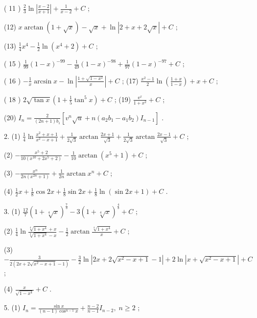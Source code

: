 ( 11 ) \(\frac{2}{3}\ln \left| \frac{x - 2}{x + 1}\right|  + \frac{1}{x - 2} + C\) ;

(12) \(x\arctan \left( {1 + \sqrt{x}}\right)  - \sqrt{x} + \ln \left| {2 + x + 2\sqrt{x}}\right|  + C\) ;

(13) \(\frac{1}{4}{x}^{4} - \frac{1}{2}\ln \left( {{x}^{4} + 2}\right)  + C\) ;

( 15 ) \(\frac{1}{99}{\left( 1 - x\right) }^{-{99}} - \frac{1}{49}{\left( 1 - x\right) }^{-{98}} + \frac{1}{97}{\left( 1 - x\right) }^{-{97}} + C\) ;

( 16 ) \(- \frac{1}{x}\arcsin x - \ln \left| \frac{1 + \sqrt{1 - {x}^{2}}}{x}\right|  + C\) ; (17) \(\frac{{x}^{2} - 1}{2}\ln \left( \frac{1 + x}{1 - x}\right)  + x + C\) ;

( 18 ) \(2\sqrt{\tan x}\left( {1 + \frac{1}{5}{\tan }^{5}x}\right)  + C\) ; (19) \(\frac{{\mathrm{e}}^{x}}{1 + {x}^{2}} + C\) ;

(20) \({I}_{n} = \frac{2}{\left( {{2n} + 1}\right) {b}_{1}}\left\lbrack  {{v}^{n}\sqrt{u} + n\left( {{a}_{2}{b}_{1} - {a}_{1}{b}_{2}}\right) {I}_{n - 1}}\right\rbrack\) .

2. (1) \(\frac{1}{4}\ln \frac{{x}^{2} + x + 1}{{x}^{2} - x + 1} + \frac{1}{2\sqrt{3}}\arctan \frac{{2x} + 1}{\sqrt{3}} + \frac{1}{2\sqrt{3}}\arctan \frac{{2x} - 1}{\sqrt{3}} + C\) ;

(2) \(- \frac{{x}^{5} + 2}{{10}\left( {{x}^{10} + 2{x}^{5} + 2}\right) } - \frac{1}{10}\arctan \left( {{x}^{5} + 1}\right)  + C\) ;

(3) \(- \frac{{x}^{n}}{{2n}\left( {{x}^{2n} + 1}\right) } + \frac{1}{2n}\arctan {x}^{n} + C\) ;

(4) \(\frac{1}{2}x + \frac{1}{8}\cos {2x} + \frac{1}{8}\sin {2x} + \frac{1}{8}\ln \left( {\sin {2x} + 1}\right)  + C\) .

3. (1) \(\frac{12}{7}{\left( 1 + \sqrt[4]{x}\right) }^{\frac{7}{3}} - 3{\left( 1 + \sqrt[4]{x}\right) }^{\frac{4}{3}} + C\) ;

(2) \(\frac{1}{4}\ln \frac{\sqrt[4]{1 + {x}^{4}} + x}{\sqrt[4]{1 + {x}^{4}} - x} - \frac{1}{2}\arctan \frac{\sqrt[4]{1 + {x}^{4}}}{x} + C\) ;

(3) \(- \frac{3}{2\left( {{2x} + 2\sqrt{{x}^{2} - x + 1} - 1}\right) } - \frac{3}{2}\ln \left| {{2x} + 2\sqrt{{x}^{2} - x + 1} - 1}\right|  + 2\ln \left| {x + \sqrt{{x}^{2} - x + 1}}\right|  + C\) ;

(4) \(\frac{x}{\sqrt{1 - {x}^{4}}} + C\) .

5. (1) \({I}_{n} = \frac{\sin x}{\left( {n - 1}\right) {\cos }^{n - 1}x} + \frac{n - 2}{n - 1}{I}_{n - 2},\;n \geq  2\) ;


